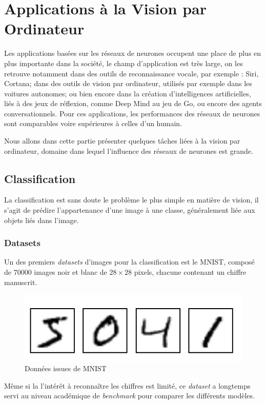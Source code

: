 \documentclass[a4paper, 10pt]{report}
\begin{document}
\section{Applications à la Vision par Ordinateur}
Les applications basées sur les réseaux de neurones occupent une place de plus en plus importante dans la société, le champ d'application est très large, on les retrouve notamment dans des outils de reconnaissance vocale, par exemple : Siri, Cortana; dans des outils de vision par ordinateur, utilisés par exemple dans les voitures autonomes; ou bien encore dans la création d'intelligences artificielles, liés à des jeux de réflexion, comme Deep Mind au jeu de Go, ou encore des agents conversationnels.
Pour ces applications, les performances des réseaux de neurones sont comparables voire supérieures à celles d'un humain.

Nous allons dans cette partie présenter quelques tâches liées à la vision par ordinateur, domaine dans lequel l'influence des réseaux de neurones est grande.
\subsection{Classification}
La classification est sans doute le problème le plus simple en matière de vision, il s'agit de prédire l'appartenance d'une image à une classe, généralement liée aux objets liés dans l'image.
\subsubsection{Datasets}
Un des premiers \emph{datasets} d'images pour la classification est le MNIST, composé de $70000$ images noir et blanc de $28 \times 28$ pixels, chacune contenant un chiffre manuscrit.
\begin{figure}[H]
	\begin{center}
		\includegraphics[scale=0.3]{Images/MNIST_Digits.png}
		\caption{Données issues de MNIST}
	\end{center}
\end{figure}
Même si la l'intérêt à reconnaître les chiffres est limité, ce \emph{dataset} a longtemps servi au niveau académique de \emph{benchmark} pour comparer les différents modèles.
\end{document}

